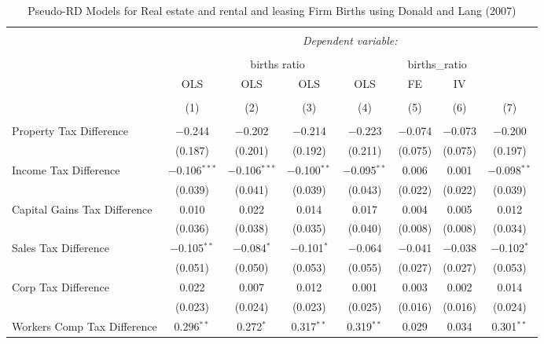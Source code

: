 
\begin{table}[!htbp] \centering 
  \caption{Pseudo-RD Models for  Real estate and rental and leasing Firm Births using Donald and Lang (2007)} 
  \label{} 
\begin{tabular}{@{\extracolsep{5pt}}lccccccc} 
\\[-1.8ex]\hline 
\hline \\[-1.8ex] 
 & \multicolumn{7}{c}{\textit{Dependent variable:}} \\ 
\cline{2-8} 
\\[-1.8ex] & \multicolumn{4}{c}{births ratio} & \multicolumn{2}{c}{births\_ratio} &   \\ 
 & OLS & OLS & OLS & OLS & FE & IV &  \\ 
\\[-1.8ex] & (1) & (2) & (3) & (4) & (5) & (6) & (7)\\ 
\hline \\[-1.8ex] 
 Property Tax Difference & $-$0.244 & $-$0.202 & $-$0.214 & $-$0.223 & $-$0.074 & $-$0.073 & $-$0.200 \\ 
  & (0.187) & (0.201) & (0.192) & (0.211) & (0.075) & (0.075) & (0.197) \\ 
  Income Tax Difference & $-$0.106$^{***}$ & $-$0.106$^{***}$ & $-$0.100$^{**}$ & $-$0.095$^{**}$ & 0.006 & 0.001 & $-$0.098$^{**}$ \\ 
  & (0.039) & (0.041) & (0.039) & (0.043) & (0.022) & (0.022) & (0.039) \\ 
  Capital Gains Tax Difference & 0.010 & 0.022 & 0.014 & 0.017 & 0.004 & 0.005 & 0.012 \\ 
  & (0.036) & (0.038) & (0.035) & (0.040) & (0.008) & (0.008) & (0.034) \\ 
  Sales Tax Difference & $-$0.105$^{**}$ & $-$0.084$^{*}$ & $-$0.101$^{*}$ & $-$0.064 & $-$0.041 & $-$0.038 & $-$0.102$^{*}$ \\ 
  & (0.051) & (0.050) & (0.053) & (0.055) & (0.027) & (0.027) & (0.053) \\ 
  Corp Tax Difference & 0.022 & 0.007 & 0.012 & 0.001 & 0.003 & 0.002 & 0.014 \\ 
  & (0.023) & (0.024) & (0.023) & (0.025) & (0.016) & (0.016) & (0.024) \\ 
  Workers Comp Tax Difference & 0.296$^{**}$ & 0.272$^{*}$ & 0.317$^{**}$ & 0.319$^{**}$ & 0.029 & 0.034 & 0.301$^{**}$ \\ 

\end{tabular}
\end{table}
